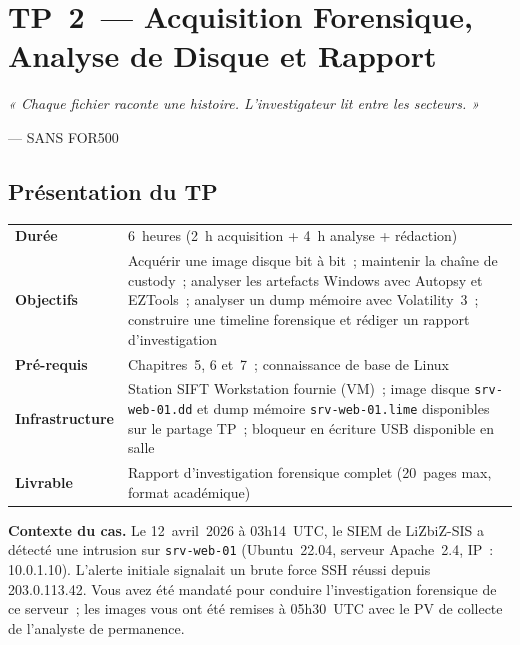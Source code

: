 
\chapter{TP~2~— Acquisition Forensique, Analyse de Disque et Rapport}
\label{lab:forensics}

\epigraph{\itshape « Chaque fichier raconte une histoire.
  L'investigateur lit entre les secteurs. »}
         {--- SANS FOR500}

\section*{Présentation du TP}

\begin{table}[H]
\centering\small
{}
\begin{tabular}{p{3.5cm}p{10cm}}
\toprule
\textbf{Durée} & 6~heures (2~h acquisition + 4~h analyse + rédaction) \\
\textbf{Objectifs} & Acquérir une image disque bit à bit~; maintenir la
  chaîne de custody~; analyser les artefacts Windows avec Autopsy et EZTools~;
  analyser un dump mémoire avec Volatility~3~; construire une timeline
  forensique et rédiger un rapport d'investigation \\
\textbf{Pré-requis} & Chapitres~5, 6 et~7~; connaissance de base de Linux \\
\textbf{Infrastructure} & Station SIFT Workstation fournie (VM)~;
  image disque \texttt{srv-web-01.dd} et dump mémoire
  \texttt{srv-web-01.lime} disponibles sur le partage TP~;
  bloqueur en écriture USB disponible en salle \\
\textbf{Livrable} & Rapport d'investigation forensique complet
  (20~pages max, format académique) \\
\bottomrule
\end{tabular}
\end{table}

\textbf{Contexte du cas.}
Le 12~avril~2026 à 03h14~UTC, le SIEM de LiZbiZ-SIS a détecté une
intrusion sur \texttt{srv-web-01} (Ubuntu~22.04, serveur Apache~2.4,
IP~: 10.0.1.10). L'alerte initiale signalait un brute force SSH réussi
depuis 203.0.113.42. Vous avez été mandaté pour conduire l'investigation
forensique de ce serveur~; les images vous ont été remises à 05h30~UTC
avec le PV de collecte de l'analyste de permanence.


